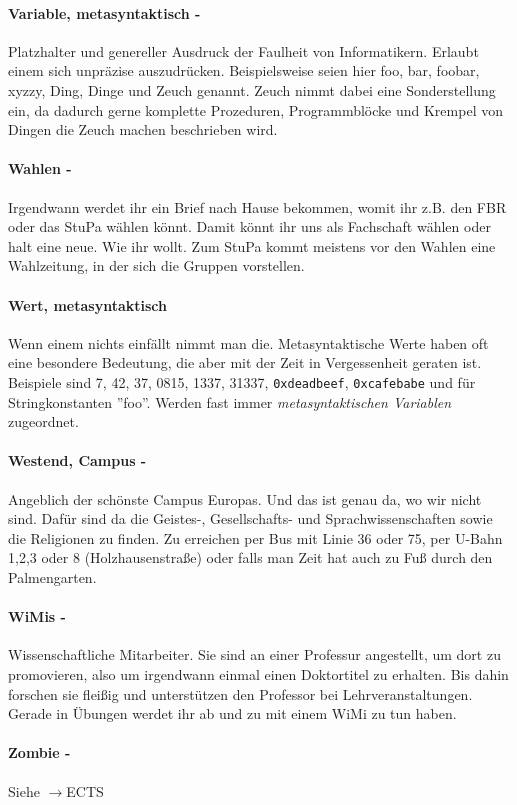 \paragraph{Variable, metasyntaktisch -} Platzhalter und genereller Ausdruck der Faulheit von Informatikern. Erlaubt einem sich unpr\"azise auszudr\"ucken. Beispielsweise seien hier foo, bar, foobar, xyzzy, Ding, Dinge und Zeuch genannt. Zeuch nimmt dabei eine Sonderstellung ein, da dadurch gerne komplette Prozeduren, Programmbl\"ocke und Krempel von Dingen die Zeuch machen beschrieben wird.
\paragraph{Wahlen -} Irgendwann werdet ihr ein Brief nach Hause bekommen, womit ihr z.B. den FBR oder das StuPa wählen könnt. Damit könnt ihr uns als Fachschaft w\"ahlen oder halt eine neue. Wie ihr wollt. Zum StuPa kommt meistens vor den Wahlen eine Wahlzeitung, in der sich die Gruppen vorstellen.
\paragraph{Wert, metasyntaktisch} Wenn einem nichts einf\"allt nimmt man die. Metasyntaktische Werte haben oft eine besondere Bedeutung, die aber mit der Zeit in Vergessenheit geraten ist. Beispiele sind 7, 42, 37, 0815, 1337, 31337, \texttt{0xdeadbeef}, \texttt{0xcafebabe} und f\"ur Stringkonstanten ''foo''. Werden fast immer \textit{metasyntaktischen Variablen} zugeordnet.
\paragraph{Westend, Campus -} Angeblich der schönste Campus Europas. Und das ist genau da, wo wir nicht sind. Dafür sind da die Geistes-, Gesellschafts- und Sprachwissenschaften sowie die Religionen zu finden. Zu erreichen per Bus mit Linie 36 oder 75, per U-Bahn 1,2,3 oder 8 (Holzhausenstraße) oder falls man Zeit hat auch zu Fuß durch den Palmengarten.
\paragraph{WiMis -} Wissenschaftliche Mitarbeiter. Sie sind an einer Professur angestellt, um dort zu promovieren, also um irgendwann einmal einen Doktortitel zu erhalten. Bis dahin forschen sie fleißig und unterstützen den Professor bei Lehrveranstaltungen. Gerade in Übungen werdet ihr ab und zu mit einem WiMi zu tun haben.
\paragraph{Zombie -} Siehe $ \rightarrow$ECTS
\spaltenende

